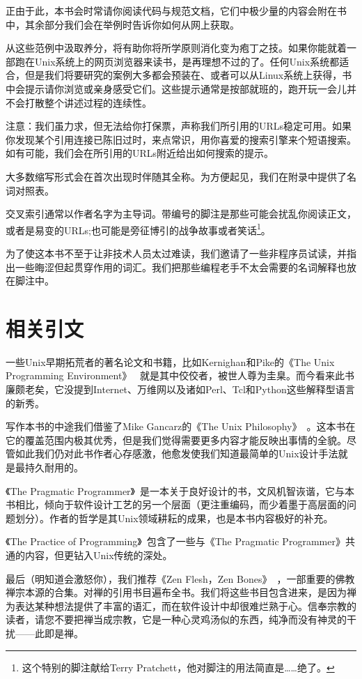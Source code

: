 \documentclass[12pt,oneside]{ctexbook}
\begin{document}
\begin{common-format}
{正由于此，本书会时常请你阅读代码与规范文档，它们中极少量的内容会附在书中，其余部分我们会在举例时告诉你如何从网上获取。

从这些范例中汲取养分，将有助你将所学原则消化变为疱丁之技。如果你能就着一部跑在Unix系统上的网页浏览器来读书，是再理想不过的了。任何Unix系统都适合，但是我们将要研究的案例大多都会预装在、或者可以从Linux系统上获得，书中会提示请你浏览或亲身感受它们。这些提示通常是按部就班的，跑开玩一会儿并不会打散整个讲述过程的连续性。

注意：我们虽力求，但无法给你打保票，声称我们所引用的URLs稳定可用。如果你发现某个引用连接已陈旧过时，来点常识，用你喜爱的搜索引擎来个短语搜索。如有可能，我们会在所引用的URLs附近给出如何搜索的提示。

大多数缩写形式会在首次出现时伴随其全称。为方便起见，我们在附录中提供了名词对照表。

交叉索引通常以作者名字为主导词。带编号的脚注是那些可能会扰乱你阅读正文，或者是易变的URLs;也可能是旁征博引的战争故事或者笑话\footnote{这个特别的脚注献给Terry Pratchett，他对脚注的用法简直是……绝了。}。

为了使这本书不至于让非技术人员太过难读，我们邀请了一些非程序员试读，并指出一些晦涩但起贯穿作用的词汇。我们把那些编程老手不太会需要的名词解释也放在脚注中。

\section{相关引文}
一些Unix早期拓荒者的著名论文和书籍，比如Kernighan和Pike的《The Unix Programming Environment》~\cite{Kernighan-Pike84} 就是其中佼佼者，被世人尊为圭臬。而今看来此书廉颇老矣，它没提到Internet、万维网以及诸如Perl、Tcl和Python这些解释型语言的新秀。

写作本书的中途我们借鉴了Mike Gancarz的《The Unix Philosophy》~\cite{Gancarz}。这本书在它的覆盖范围内极其优秀，但是我们觉得需要更多内容才能反映出事情的全貌。尽管如此我们仍对此书作者心存感激，他愈发使我们知道最简单的Unix设计手法就是最持久耐用的。

《The Pragmatic Programmer》~\cite{Hunt-Thomas}是一本关于良好设计的书，文风机智诙谐，它与本书相比，倾向于软件设计工艺的另一个层面（更注重编码，而少着墨于高层面的问题划分）。作者的哲学是其Unix领域耕耘的成果，也是本书内容极好的补充。

《The Practice of Programming》~\cite{Kernighan-Pike99}包含了一些与《The Pragmatic Programmer》共通的内容，但更钻入Unix传统的深处。

最后（明知道会激怒你），我们推荐《Zen Flesh，Zen Bones》~\cite{Reps-Senzaki}，一部重要的佛教禅宗本源的合集。对禅的引用书目遍布全书。我们将这些书目包含进来，是因为禅为表达某种想法提供了丰富的语汇，而在软件设计中却很难烂熟于心。信奉宗教的读者，请您不要把禅当成宗教，它是一种心灵鸡汤似的东西，纯净而没有神灵的干扰——此即是禅。

}
\end{common-format}
\end{document}

